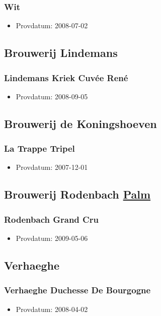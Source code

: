 \documentclass[11pt]{article}
\begin{document}
\subsubsection{Wit}
\label{sec:org815538d}
\begin{itemize}
\item Provdatum: 2008-07-02
\end{itemize}
\subsection{Brouwerij Lindemans}
\label{sec:orgfee2a48}
\subsubsection{Lindemans Kriek Cuvée René}
\label{sec:org1348029}
\begin{itemize}
\item Provdatum: 2008-09-05
\end{itemize}
\subsection{Brouwerij de Koningshoeven}
\label{sec:org9f67757}
\subsubsection{La Trappe Tripel}
\label{sec:org4efe253}
\begin{itemize}
\item Provdatum: 2007-12-01
\end{itemize}
\subsection{Brouwerij Rodenbach \underline{Palm}}
\label{sec:org5ee27b8}
\subsubsection{Rodenbach Grand Cru}
\label{sec:orgd33ecb7}
\begin{itemize}
\item Provdatum: 2009-05-06
\end{itemize}
\subsection{Verhaeghe}
\label{sec:org93a7970}
\subsubsection{Verhaeghe Duchesse De Bourgogne}
\label{sec:org8389670}
\begin{itemize}
\item Provdatum: 2008-04-02
\end{itemize}
\end{document}
